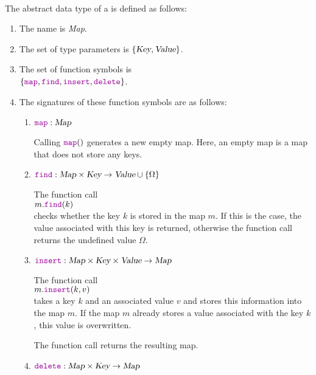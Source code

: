 \begin{Definition}[Map] \hspace*{\fill} \\
  The abstract data type of a  is defined as follows:
  \begin{enumerate}
  \item The name is \textsl{Map}.
  \item The set of type parameters is $\{ \textsl{Key}, \textsl{Value} \}$.
  \item The set of function symbols is \\[0.1cm]
       \hspace*{1.3cm} 
       $\{ \mytt{map}, \mytt{find}, \mytt{insert}, \mytt{delete} \}$.
  \item The signatures of these function symbols are as follows:
        \begin{enumerate}
        \item $\mytt{map}: \textsl{Map}$

              Calling $\mytt{map}()$ generates a new empty map.  Here, an empty map is a map that
              does not store any keys.
        \item $\mytt{find}: \textsl{Map} \times \textsl{Key} \rightarrow \textsl{Value} \cup \{\Omega\}$

              The function call
              \\[0.2cm]
              \hspace*{1.3cm}
              $m.\mytt{find}(k)$ 
              \\[0.2cm]
              checks whether the key $k$ is stored in the map $m$.  If this is the case, the
              value associated with this key is returned, otherwise the function call returns
              the undefined value $\Omega$.
        \item $\mytt{insert}: \textsl{Map} \times \textsl{Key} \times \textsl{Value} \rightarrow \textsl{Map}$

              The function call
              \\[0.2cm]
              \hspace*{1.3cm}
              $m.\mytt{insert}(k,v)$ 
              \\[0.2cm]
              takes a key $k$ and an associated value $v$ and stores this information into the map
              $m$.  If the map $m$ already stores a value associated with the key $k$, this value
              is overwritten.  

              The function call returns the resulting map.
        \item $\mytt{delete}: \textsl{Map} \times \textsl{Key} \rightarrow \textsl{Map}$


\end{enumerate}
\end{enumerate}
\end{Definition}
